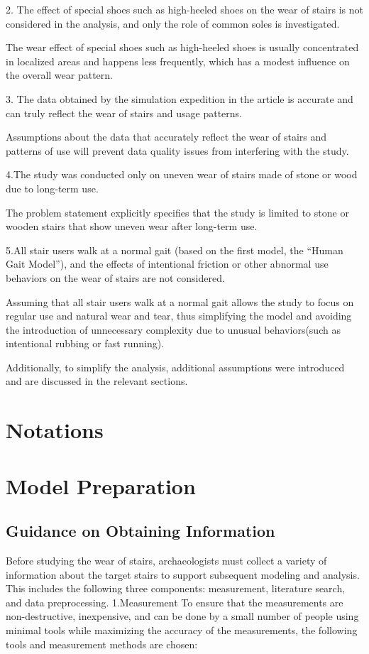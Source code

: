 \documentclass{mcmthesis}
\begin{document}
2. The effect of special shoes such as high-heeled shoes on the wear of stairs is not considered in the analysis, and only the role of common soles is investigated.

The wear effect of special shoes such as high-heeled shoes is usually concentrated in localized areas and happens less frequently, which has a modest influence on the overall wear pattern.

3. The data obtained by the simulation expedition in the article is accurate and can truly reflect the wear of stairs and usage patterns.

Assumptions about the data that accurately reflect the wear of stairs and patterns of use will prevent data quality issues from interfering with the study.

4.The study was conducted only on uneven wear of stairs made of stone or wood due to long-term use.

The problem statement explicitly specifies that the study is limited to stone or wooden stairs that show uneven wear after long-term use.

5.All stair users walk at a normal gait (based on the first model, the “Human Gait Model”), and the effects of intentional friction or other abnormal use behaviors on the wear of stairs are not considered.

Assuming that all stair users walk at a normal gait allows the study to focus on regular use and natural wear and tear, thus simplifying the model and avoiding the introduction of unnecessary complexity due to unusual behaviors(such as intentional rubbing or fast running).


Additionally, to simplify the analysis, additional assumptions were introduced and are discussed in the relevant sections.
\section{Notations}%
\section{Model Preparation}
\subsection{Guidance on Obtaining Information}
Before studying the wear of stairs, archaeologists must collect a variety of information about the target stairs to support subsequent modeling and analysis. This includes the following three components: measurement, literature search, and data preprocessing.
1.Measurement
To ensure that the measurements are non-destructive, inexpensive, and can be done by a small number of people using minimal tools while maximizing the accuracy of the measurements, the following tools and measurement methods are chosen:
\end{document}
